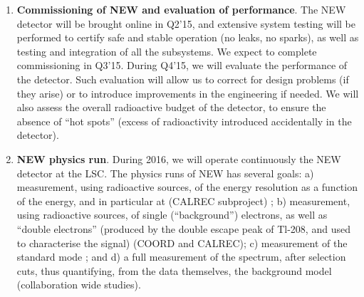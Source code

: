\begin{enumerate}
\item {\bf Commissioning of NEW and evaluation of performance}. The NEW detector will be brought online in Q2'15, and extensive system testing will be performed to certify safe and stable operation (no leaks, no sparks), as well as testing and integration of all the subsystems. We expect to complete commissioning in Q3'15.
During Q4'15, we will evaluate the performance of the detector. Such evaluation will allow us to correct for design problems (if they arise) or to introduce improvements in the engineering if needed. We will also assess the overall radioactive budget of the detector, to ensure the absence of ``hot spots'' (excess of radioactivity introduced accidentally in the detector). 

\item {\bf NEW physics run}. During 2016, we will operate continuously the NEW detector at the LSC. The physics runs of NEW has several goals: a) measurement, using radioactive sources, of the energy resolution as a function of the energy, and in particular at \Qbb (CALREC subproject) ; b) measurement, using radioactive sources, of single (``background'') electrons, as well as ``double electrons'' (produced by the double escape peak of Tl-208, and used to characterise the signal) (COORD and CALREC); c) measurement of the standard mode \bbtnu; and d) a full measurement of the spectrum, after selection cuts, thus quantifying, from the data themselves, the background model (collaboration wide studies). 
%


\end{enumerate}
